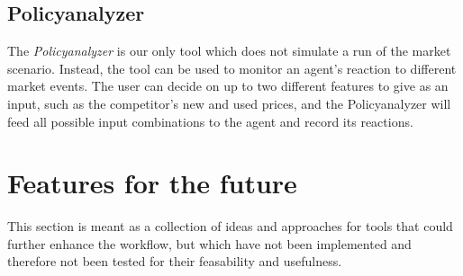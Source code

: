 \subsection{Policyanalyzer}

The \emph{Policyanalyzer} is our only tool which does not simulate a run of the market scenario. Instead, the tool can be used to monitor an agent's reaction to different market events. The user can decide on up to two different features to give as an input, such as the competitor's new and used prices, and the Policyanalyzer will feed all possible input combinations to the agent and record its reactions. 

\section{Features for the future}

This section is meant as a collection of ideas and approaches for tools that could further enhance the workflow, but which have not been implemented and therefore not been tested for their feasability and usefulness.
